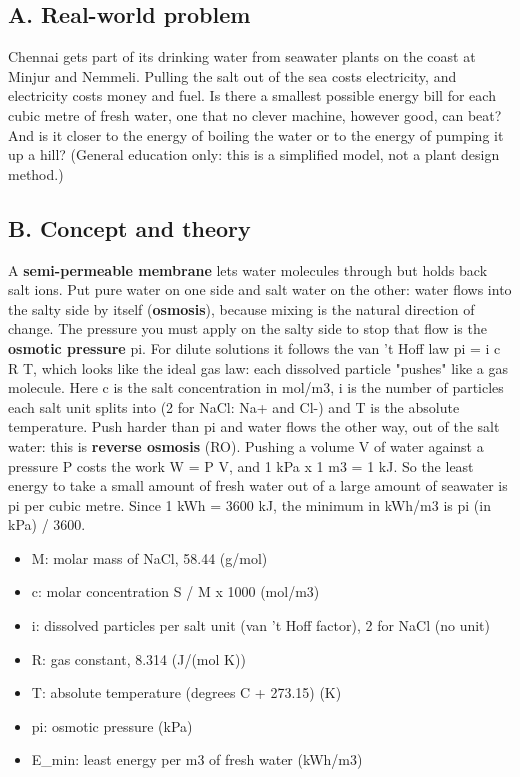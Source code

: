 \documentclass[11pt,a4paper]{article}
\begin{document}
\subsection*{A. Real-world problem}
Chennai gets part of its drinking water from seawater plants on the coast at Minjur and Nemmeli. Pulling the salt out of the sea costs electricity, and electricity costs money and fuel. Is there a smallest possible energy bill for each cubic metre of fresh water, one that no clever machine, however good, can beat? And is it closer to the energy of boiling the water or to the energy of pumping it up a hill? (General education only: this is a simplified model, not a plant design method.)

\subsection*{B. Concept and theory}
A \textbf{semi-permeable membrane} lets water molecules through but holds back salt ions. Put pure water on one side and salt water on the other: water flows into the salty side by itself (\textbf{osmosis}), because mixing is the natural direction of change. The pressure you must apply on the salty side to stop that flow is the \textbf{osmotic pressure} pi. For dilute solutions it follows the van 't Hoff law pi = i c R T, which looks like the ideal gas law: each dissolved particle "pushes" like a gas molecule. Here c is the salt concentration in mol/m3, i is the number of particles each salt unit splits into (2 for NaCl: Na+ and Cl-) and T is the absolute temperature. Push harder than pi and water flows the other way, out of the salt water: this is \textbf{reverse osmosis} (RO). Pushing a volume V of water against a pressure P costs the work W = P V, and 1 kPa x 1 m3 = 1 kJ. So the least energy to take a small amount of fresh water out of a large amount of seawater is pi per cubic metre. Since 1 kWh = 3600 kJ, the minimum in kWh/m3 is pi (in kPa) / 3600.

\begin{itemize}[nosep]
\item M: molar mass of NaCl, 58.44 (g/mol)
\item c: molar concentration S / M x 1000 (mol/m3)
\item i: dissolved particles per salt unit (van 't Hoff factor), 2 for NaCl (no unit)
\item R: gas constant, 8.314 (J/(mol K))
\item T: absolute temperature (degrees C + 273.15) (K)
\item pi: osmotic pressure (kPa)
\item E\_min: least energy per m3 of fresh water (kWh/m3)
\end{itemize}
\end{document}
